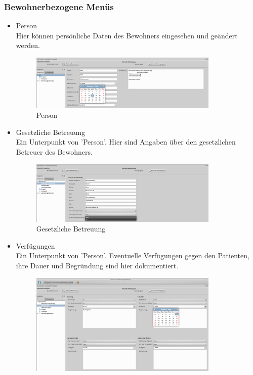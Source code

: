 \subsubsection{Bewohnerbezogene Menüs}
\begin{itemize}
	\item Person\mbox{}\\
	\noindent
	Hier können persönliche Daten des Bewohners eingesehen und geändert werden.
	\begin{figure}[h]
		\begin{center}
			\includegraphics[keepaspectratio=true, width=0.85\textwidth]{pics/client_person.png}
			\caption{Person}
		\end{center}
	\end{figure}
	\FloatBarrier
	\item Gesetzliche Betreuung\mbox{}\\
	\noindent
	Ein Unterpunkt von 'Person'. Hier sind Angaben über den gesetzlichen Betreuer des Bewohners.
	\begin{figure}[h]
		\begin{center}
			\includegraphics[keepaspectratio=true, width=0.85\textwidth]{pics/client_betreuung.png}
			\caption{Gesetzliche Betreuung}
		\end{center}
	\end{figure}
	\FloatBarrier
	\newpage
	\item Verfügungen\mbox{}\\
	\noindent
	Ein Unterpunkt von 'Person'. Eventuelle Verfügungen gegen den Patienten, ihre Dauer und Begründung sind hier dokumentiert.
	\begin{figure}[h!]
		\begin{center}
			\includegraphics[keepaspectratio=true, width=0.85\textwidth]{pics/client_verfuegung.png}

\end{center}
\end{figure}
\end{itemize}
